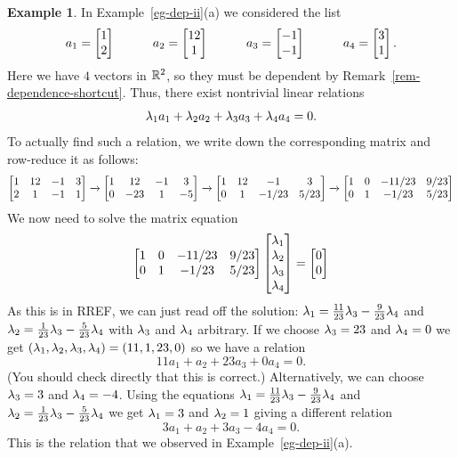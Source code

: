 \documentclass[reqno]{amsart}
\theoremstyle{definition}
\newtheorem{example}[theorem]{Example}
\begin{document}
\begin{example}\label{eg-dep-ii-matrix}
 In Example~\ref{eg-dep-ii}(a) we considered the list
 \[ a_1 = \left[\begin{matrix}  1 \\  2 \end{matrix}\right] \hspace{3em}
    a_2 = \left[\begin{matrix} 12 \\  1 \end{matrix}\right] \hspace{3em}
    a_3 = \left[\begin{matrix} -1 \\ -1 \end{matrix}\right] \hspace{3em}
    a_4 = \left[\begin{matrix}  3 \\  1 \end{matrix}\right].
 \]
 Here we have $4$ vectors in ${\mathbb{R}}^2$, so they must be dependent by
 Remark~\ref{rem-dependence-shortcut}.  Thus, there exist nontrivial
 linear relations
 \[ \lambda_1a_1 + \lambda_2a_2 + \lambda_3a_3 + \lambda_4a_4 = 0. \]
 To actually find such a relation, we write down the corresponding
 matrix and row-reduce it as follows:
 \[
  \left[\begin{matrix}
   1 & 12 & -1 & 3 \\
   2 & 1  & -1 & 1
  \end{matrix}\right]
  \xrightarrow{}
  \left[\begin{matrix}
   1 &  12 & -1 & 3 \\
   0 & -23 &  1 & -5
  \end{matrix}\right]
  \xrightarrow{}
  \left[\begin{matrix}
   1 &  12 & -1 & 3 \\
   0 &  1 & -1/23 & 5/23
  \end{matrix}\right]
  \xrightarrow{}
  \left[\begin{matrix}
   1 &  0 & -11/23 & 9/23 \\
   0 &  1 & -1/23 & 5/23
  \end{matrix}\right]
 \]
 We now need to solve the matrix equation
 \[ \left[\begin{matrix}
     1 &  0 & -11/23 & 9/23 \\
     0 &  1 & -1/23 & 5/23
    \end{matrix}\right]
    \left[\begin{matrix} \lambda_1 \\ \lambda_2 \\ \lambda_3 \\ \lambda_4 \end{matrix}\right] =
    \left[\begin{matrix} 0 \\ 0 \end{matrix}\right]
 \]
 As this is in RREF, we can just read off the solution:
 $\lambda_1=\frac{11}{23}\lambda_3-\frac{9}{23}\lambda_4$ and
 $\lambda_2=\frac{1}{23}\lambda_3-\frac{5}{23}\lambda_4$
 with $\lambda_3$ and $\lambda_4$ arbitrary.  If we choose $\lambda_3=23$ and
 $\lambda_4=0$ we get $(\lambda_1,\lambda_2,\lambda_3,\lambda_4)=(11,1,23,0)$ so we have a
 relation
 \[ 11 a_1 + a_2 + 23 a_3 + 0 a_4 = 0. \]
 (You should check directly that this is correct.)  Alternatively, we
 can choose $\lambda_3=3$ and $\lambda_4=-4$.  Using the equations
 $\lambda_1=\frac{11}{23}\lambda_3-\frac{9}{23}\lambda_4$ and
 $\lambda_2=\frac{1}{23}\lambda_3-\frac{5}{23}\lambda_4$ we get $\lambda_1=3$ and
 $\lambda_2=1$ giving a different relation
 \[ 3a_1 + a_2 + 3a_3 - 4a_4 = 0. \]
 This is the relation that we observed in Example~\ref{eg-dep-ii}(a).
\end{example}
\end{document}
